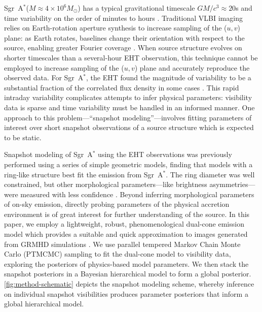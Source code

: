 \documentclass[linenumbers, twocolumn, tighten]{aastex701}
\def\sgra{Sgr~A$^*$\xspace}
\begin{document}
\sgra ($M \approx 4 \times 10^6 M_\odot$) 
has a typical gravitational timescale $GM/c^3 \approx 20$s and time variability on the order of minutes to hours \citep[][see also ]{2019Sci...365..664D, 2019A&A...625L..10G, 2020A&A...636L...5G}. Traditional VLBI imaging relies on Earth-rotation aperture synthesis to increase sampling of the ($u, v$) plane: as Earth rotates, baselines change their orientation with respect to the source, enabling greater Fourier coverage \citep{2017isra.book.....T}. When source structure evolves on shorter timescales than a several-hour EHT observation, this technique cannot be employed to increase sampling of the ($u, v$) plane and accurately reproduce the observed data. For \sgra, the EHT found the magnitude of variability to be a substantial fraction of the correlated flux density in some cases . This rapid intraday variability complicates attempts to infer physical parameters: visibility data is sparse and time variability must be handled in an informed manner. One approach to this problem---``snapshot modeling''---involves fitting parameters of interest over short snapshot observations of a source structure which is expected to be static.

Snapshot modeling of \sgra using the EHT observations was previously performed using a series of simple geometric models, finding that models with a ring-like structure best fit the emission from \sgra {}. The ring diameter was well constrained, but other morphological parameters---like brightness asymmetries---were measured with less confidence . Beyond inferring morphological parameters of on-sky emission, directly probing parameters of the physical accretion environment is of great interest for further understanding of the source. In this paper, we employ a lightweight, robust, phenomenological dual-cone emission model which provides a suitable and quick approximation to images generated from GRMHD simulations \citep{Chang2024}. We use parallel tempered Markov Chain Monte Carlo (PTMCMC) sampling to fit the dual-cone model to visibility data, exploring the posteriors of physics-based model parameters. We then stack the snapshot posteriors in a Bayesian hierarchical model to form a global posterior. \autoref{fig:method-schematic} depicts the snapshot modeling scheme, whereby inference on individual snapshot visibilities produces parameter posteriors that inform a global hierarchical model.
\end{document}
